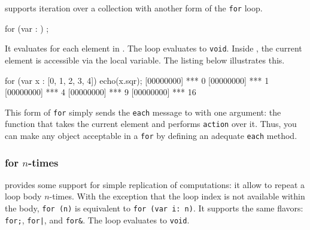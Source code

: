 \us supports iteration over a collection with another form of the
\lstinline|for| loop.

\begin{urbiunchecked}
for (var  : )
   ;
\end{urbiunchecked}

It evaluates  for each element in . The loop
evaluates to \lstinline|void|.  Inside , the current element
is accessible via the  local variable. The listing below
illustrates this.

\begin{urbiscript}
for (var x : [0, 1, 2, 3, 4])
  echo(x.sqr);
[00000000] *** 0
[00000000] *** 1
[00000000] *** 4
[00000000] *** 9
[00000000] *** 16
\end{urbiscript}

This form of \lstinline|for| simply sends the \lstinline|each| message
to  with one argument: the function that takes the
current element and performs \lstinline|action| over it. Thus, you can
make any object acceptable in a \lstinline|for| by defining an
adequate \lstinline|each| method.


\subsubsection{for $n$-times}
\label{sec:lang:for:n}

\us provides some support for simple replication of computations: it
allow to repeat a loop body $n$-times.  With the exception that the
loop index is not available within the body, \lstinline|for (n)| is
equivalent to \lstinline|for (var i: n)|.  It supports the same
flavors: \lstinline|for;|, \lstinline{for|}, and \lstinline|for&|. The
loop evaluates to \lstinline|void|.

